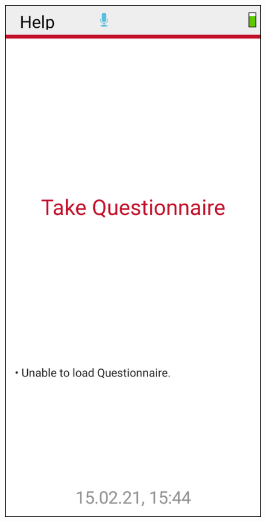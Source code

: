\documentclass[11pt,a4paper,titlepage]{article}
\begin{document}
\begin{figure}
\vspace{-0.5cm}
		\centering
			\begin{minipage}{0.30\textwidth}
			\includegraphics[width=1.00\textwidth]{images/error_quest_box.png}
			\label{fig:menu}
			\end{minipage}
	\end{figure}
\end{document}
